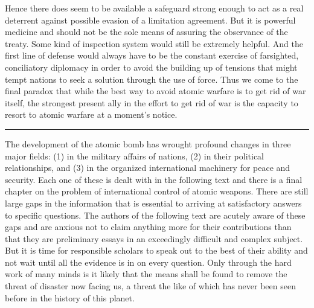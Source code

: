 \begin{introduction}
Hence there does seem to be available a safeguard strong enough to act as a real deterrent against possible evasion of a limitation agreement. But it is powerful medicine and should not be the sole means of assuring the observance of the treaty. Some kind of inspection system would still be extremely helpful. And the first line of defense would always have to be the constant exercise of farsighted, conciliatory diplomacy in order to avoid the building up of tensions that might tempt nations to seek a solution through the use of force. Thus we come to the final paradox that while the best way to avoid atomic warfare is to get rid of war itself, the strongest present ally in the effort to get rid of war is the capacity to resort to atomic warfare at a moment's notice.

\noindent\hfil\rule{0.4\textwidth}{.4pt}\hfil

\vspace{4pt}

The development of the atomic bomb has wrought profound changes in three major fields: (1) in the military affairs of nations, (2) in their political relationships, and (3) in the organized international machinery for peace and security. Each one of these is dealt with in the following text and there is a final chapter on the problem of international control of atomic weapons. There are still large gaps in the information that is essential to arriving at satisfactory answers to specific questions. The authors of the following text are acutely aware of these gaps and are anxious not to claim anything more for their contributions than that they are preliminary essays in an exceedingly difficult and complex subject. But it is time for responsible scholars to speak out to the best of their ability and not wait until all the evidence is in on every question. Only through the hard work of many minds is it likely that the means shall be found to remove the threat of disaster now facing us, a threat the like of which has never been seen before in the history of this planet.

\end{introduction}
